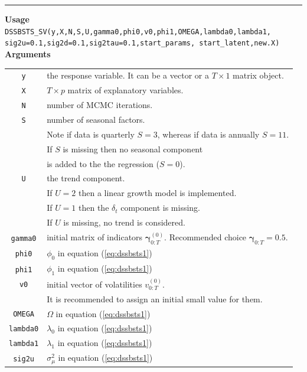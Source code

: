 \documentclass[
  12pt,
]{book}
\theoremstyle{break}
\theoremstyle{nonumberplain}
\begin{document}
\hrule
\vspace{1em}

\textbf{Usage}\\
\texttt{DSSBSTS\_SV(y,X,N,S,U,gamma0,phi0,v0,phi1,OMEGA,lambda0,lambda1,\\ sig2u=0.1,sig2d=0.1,sig2tau=0.1,start\_params, start\_latent,new.X)}\\
\textbf{Arguments}

\begin{small}
\begin{longtable}{ c l }
\texttt{y} &  the response variable. It can be a vector or a $T\times1$ matrix object. \\
\texttt{X} &  $T \times p$ matrix of explanatory variables.\\
\texttt{N} &  number of MCMC iterations. \\
\texttt{S} & number of seasonal factors. \\
 & Note if data is quarterly $S=3$, whereas if data is annually $S=11$. \\
 & If $S$ is missing then no seasonal component\\
 & is added to the the regression ($S=0$). \\
\texttt{U} &  the trend component. \\
 & If $U=2$ then a linear growth model is implemented.\\
 & If $U=1$ then the $\delta_{t}$ component is missing. \\
 & If $U$ is missing, no trend is considered.\\
\texttt{gamma0} &  initial matrix of indicators $\boldsymbol{\gamma}^{(0)}_{0:T}$. Recommended choice $\boldsymbol{\gamma}_{0:T}=0.5$.  \\  
\texttt{phi0} & $\phi_{0}$ in equation (\ref{eq:dssbsts1})\\
\texttt{phi1} &  $\phi_1$ in equation (\ref{eq:dssbsts1})\\
\texttt{v0} &  initial vector of volatilities $v^{(0)}_{0:T}$. \\
 & It is recommended to assign an initial small value for them. \\
\texttt{OMEGA} &  $\Omega$ in equation (\ref{eq:dssbsts1})\\
\texttt{lambda0} &  $\lambda_0$ in equation (\ref{eq:dssbsts1})\\
\texttt{lambda1} &  $\lambda_1$ in equation (\ref{eq:dssbsts1})\\
\texttt{sig2u} & $\sigma^{2}_{\mu}$ in equation (\ref{eq:dssbsts1})\\

\end{longtable}
\end{small}
\end{document}
